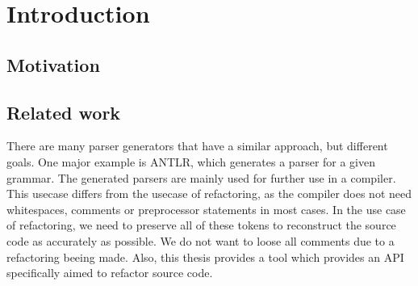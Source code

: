 \section{Introduction}

\subsection{Motivation}


\subsection{Related work}

There are many parser generators that have a similar approach, but different goals. One major example is ANTLR, which generates a parser for a given grammar. The generated parsers are mainly used for further use in a compiler. This usecase differs from the usecase of refactoring, as the compiler does not need whitespaces, comments or preprocessor statements in most cases. In the use case of refactoring, we need to preserve all of these tokens to reconstruct the source code as accurately as possible. We do not want to loose all comments due to a refactoring beeing made. Also, this thesis provides a tool which provides an API specifically aimed to refactor source code.

